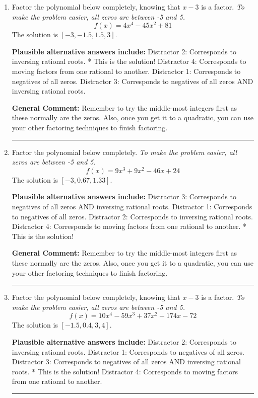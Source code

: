 \documentclass{extbook}[14pt]
\newcommand{\litem}[1]{\item #1

\rule{\textwidth}{0.4pt}}
\begin{document}
\begin{enumerate}\litem{
Factor the polynomial below completely, knowing that $x -3$ is a factor. \textit{To make the problem easier, all zeros are between -5 and 5.}
\[ f(x) = 4x^{4} -45 x^{2} + 81 \]The solution is \( [-3, -1.5, 1.5, 3] \).\begin{enumerate}[label=\Alph*.]
\textbf{Plausible alternative answers include:} Distractor 2: Corresponds to inversing rational roots.
* This is the solution!
 Distractor 4: Corresponds to moving factors from one rational to another.
 Distractor 1: Corresponds to negatives of all zeros.
 Distractor 3: Corresponds to negatives of all zeros AND inversing rational roots.
\end{enumerate}

\textbf{General Comment:} Remember to try the middle-most integers first as these normally are the zeros. Also, once you get it to a quadratic, you can use your other factoring techniques to finish factoring.
}
\litem{
Factor the polynomial below completely. \textit{To make the problem easier, all zeros are between -5 and 5.}
\[ f(x) = 9x^{3} +9 x^{2} -46 x + 24 \]The solution is \( [-3, 0.67, 1.33] \).\begin{enumerate}[label=\Alph*.]
\textbf{Plausible alternative answers include:} Distractor 3: Corresponds to negatives of all zeros AND inversing rational roots.
 Distractor 1: Corresponds to negatives of all zeros.
 Distractor 2: Corresponds to inversing rational roots.
 Distractor 4: Corresponds to moving factors from one rational to another.
* This is the solution!
\end{enumerate}

\textbf{General Comment:} Remember to try the middle-most integers first as these normally are the zeros. Also, once you get it to a quadratic, you can use your other factoring techniques to finish factoring.
}
\litem{
Factor the polynomial below completely, knowing that $x -3$ is a factor. \textit{To make the problem easier, all zeros are between -5 and 5.}
\[ f(x) = 10x^{4} -59 x^{3} +37 x^{2} +174 x -72 \]The solution is \( [-1.5, 0.4, 3, 4] \).\begin{enumerate}[label=\Alph*.]
\textbf{Plausible alternative answers include:} Distractor 2: Corresponds to inversing rational roots.
 Distractor 1: Corresponds to negatives of all zeros.
 Distractor 3: Corresponds to negatives of all zeros AND inversing rational roots.
* This is the solution!
 Distractor 4: Corresponds to moving factors from one rational to another.
\end{enumerate}

}
\end{enumerate}
\end{document}
